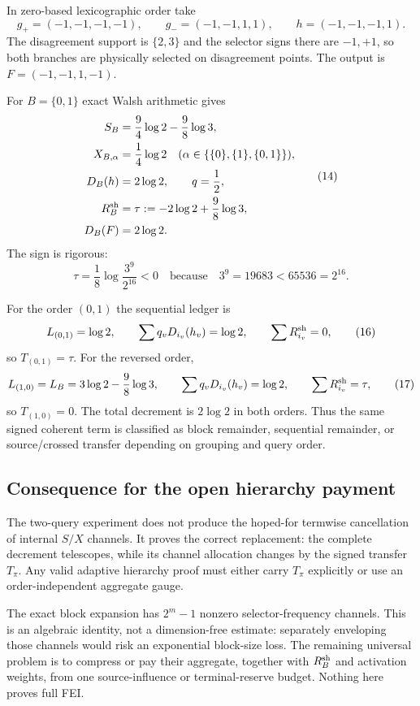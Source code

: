 In zero-based lexicographic order take
\[
 g_+=(-1,-1,-1,-1),\qquad
 g_-=(-1,-1,1,1),\qquad
 h=(-1,-1,-1,1).
\tag{13}
\]
The disagreement support is $\{2,3\}$ and the selector signs there are
$-1,+1$, so both branches are physically selected on disagreement points.
The output is $F=(-1,-1,1,-1)$.

For $B=\{0,1\}$ exact Walsh arithmetic gives
\[
\begin{aligned}
 S_B&=\frac94\log2-\frac98\log3,\\
 X_{B,\alpha}&=\frac14\log2\quad
       (\alpha\in\{\{0\},\{1\},\{0,1\}\}),\\
 D_B(h)&=2\log2,\qquad q=\frac12,\\
 R_B^{\rm sh}&=\tau:=-2\log2+\frac98\log3,\\
 D_B(F)&=2\log2.
\end{aligned}
\tag{14}
\]
The sign is rigorous:
\[
 \tau=\frac18\log\frac{3^9}{2^{16}}<0
 \quad\text{because}\quad 3^9=19683<65536=2^{16}.
\tag{15}
\]

For the order $(0,1)$ the sequential ledger is
\[
 L_{(0,1)}=\log2,\qquad
 \sum q_vD_{i_v}(h_v)=\log2,\qquad
 \sum R_{i_v}^{\rm sh}=0,
\tag{16}
\]
so $T_{(0,1)}=\tau$.  For the reversed order,
\[
 L_{(1,0)}=L_B=3\log2-\frac98\log3,\qquad
 \sum q_vD_{i_v}(h_v)=\log2,\qquad
 \sum R_{i_v}^{\rm sh}=\tau,
\tag{17}
\]
so $T_{(1,0)}=0$.  The total decrement is $2\log2$ in both orders.  Thus
the same signed coherent term is classified as block remainder, sequential
remainder, or source/crossed transfer depending on grouping and query order.

\subsection*{Consequence for the open hierarchy payment}

The two-query experiment does not produce the hoped-for termwise
cancellation of internal $S/X$ channels.  It proves the correct replacement:
the complete decrement telescopes, while its channel allocation changes by
the signed transfer $T_\pi$.  Any valid adaptive hierarchy proof must either
carry $T_\pi$ explicitly or use an order-independent aggregate gauge.

The exact block expansion has $2^m-1$ nonzero selector-frequency channels.
This is an algebraic identity, not a dimension-free estimate: separately
enveloping those channels would risk an exponential block-size loss.  The
remaining universal problem is to compress or pay their aggregate, together
with $R_B^{\rm sh}$ and activation weights, from one source-influence or
terminal-reserve budget.  Nothing here proves full FEI.
